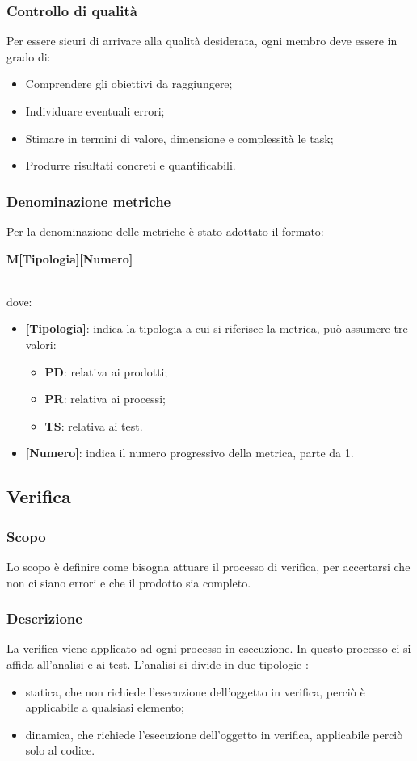 \subsubsection{Controllo di qualità}
Per essere sicuri di arrivare alla qualità desiderata, ogni membro deve essere in grado di:
\begin{itemize}
\item Comprendere gli obiettivi da raggiungere;
\item Individuare eventuali errori;
\item Stimare in termini di valore, dimensione e complessità le task;
\item Produrre risultati concreti e quantificabili.
\end{itemize}

\subsubsection{Denominazione metriche}
Per la denominazione delle metriche è stato adottato il formato: \\
\centerline{\textbf{M[Tipologia][Numero]}} \\
dove:
\begin{itemize}
\item \textbf{[Tipologia]}: indica la tipologia a cui si riferisce la metrica, può assumere tre valori:
    \begin{itemize}
    \item \textbf{PD}: relativa ai prodotti; 
    \item \textbf{PR}: relativa ai processi;
    \item \textbf{TS}: relativa ai test.
    \end{itemize}
\item \textbf{[Numero]}: indica il numero progressivo della metrica, parte da 1.
\end{itemize}


\subsection{Verifica}
\subsubsection{Scopo}
Lo scopo è definire come bisogna attuare il processo di verifica, per accertarsi che non ci siano errori e che il prodotto sia completo.

\subsubsection{Descrizione}
La verifica viene applicato ad ogni processo in esecuzione. In questo processo ci si affida all’analisi e ai test. L’analisi si divide in due tipologie :
\begin{itemize}
\item statica, che non richiede l’esecuzione dell’oggetto in verifica, perciò è applicabile a qualsiasi elemento;
\item dinamica, che richiede l’esecuzione dell’oggetto in verifica, applicabile perciò solo al codice.
\end{itemize}


